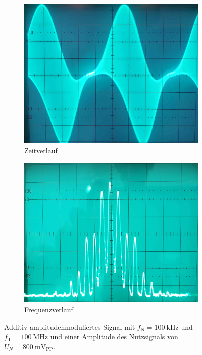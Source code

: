 \documentclass[a4paper,twoside,final]{article}
\begin{document}
\begin{figure}[htp]
    \centering
    \begin{subfigure}{0.45\textwidth}
        \includegraphics[width=\textwidth]{Bilder/AM_800mV_Amplitude.jpg}
        \caption{Zeitverlauf}
    \end{subfigure}\hspace{1cm}
    \begin{subfigure}{0.45\textwidth}
        \includegraphics[width=\textwidth]{Bilder/AM_800mV_Frequenz.jpg}
        \caption{Frequenzverlauf}
    \end{subfigure}
    \caption{Additiv amplitudenmoduliertes Signal mit $f_\text{N} = \SI{100}{\kilo\hertz}$ und $f_\text{T} = \SI{100}{\mega\hertz}$ und einer Amplitude des Nutzsignals von $U_N = \SI{800}{\milli\volt_\text{PP}}$.}
    \label{fig:Modulation_800mV}
\end{figure}\\
\end{document}
